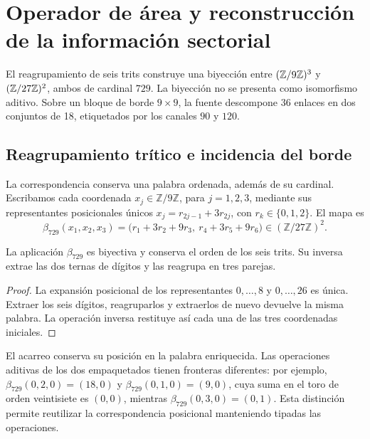 \section{Operador de área y reconstrucción de la información sectorial}
\label{v:ant:sec:area}
El reagrupamiento de seis trits construye una biyección entre
$(\mathbb Z/9\mathbb Z)^3$ y $(\mathbb Z/27\mathbb Z)^2$, ambos de cardinal $729$.
La biyección no se presenta como isomorfismo aditivo. Sobre un bloque
de borde $9\times9$, la fuente descompone 36 enlaces en dos
conjuntos de 18, etiquetados por los canales $90$ y $120$.

\subsection{Reagrupamiento trítico e incidencia del borde}
\label{v:ant:sec:ii-area-incidencia-explicita}

La correspondencia conserva una palabra ordenada, además de su cardinal.
Escribamos cada coordenada \(x_j\in\mathbb Z/9\mathbb Z\), para
\(j=1,2,3\), mediante sus representantes posicionales únicos
\(x_j=r_{2j-1}+3r_{2j}\), con \(r_k\in\{0,1,2\}\). El mapa es
\begin{equation}
 \beta_{729}(x_1,x_2,x_3)
 =\bigl(r_1+3r_2+9r_3,\ r_4+3r_5+9r_6\bigr)
 \in(\mathbb Z/27\mathbb Z)^2.
 \label{v:ant:eq:ii-area-beta729}
\end{equation}

\begin{proposition}
\label{v:ant:prop:ii-area-beta729}
La aplicación \(\beta_{729}\) es biyectiva y conserva el orden de los
seis trits. Su inversa extrae las dos ternas de dígitos y las reagrupa
en tres parejas.
\end{proposition}
\begin{proof}
La expansión posicional de los representantes \(0,\ldots,8\) y
\(0,\ldots,26\) es única. Extraer los seis dígitos, reagruparlos y
extraerlos de nuevo devuelve la misma palabra. La operación inversa
restituye así cada una de las tres coordenadas iniciales.
\end{proof}

El acarreo conserva su posición en la palabra enriquecida. Las operaciones
aditivas de los dos empaquetados tienen fronteras diferentes: por ejemplo,
\(\beta_{729}(0,2,0)=(18,0)\) y
\(\beta_{729}(0,1,0)=(9,0)\), cuya suma en el toro de orden
veintisiete es \((0,0)\), mientras
\(\beta_{729}(0,3,0)=(0,1)\). Esta distinción permite reutilizar
la correspondencia posicional manteniendo tipadas las operaciones.

